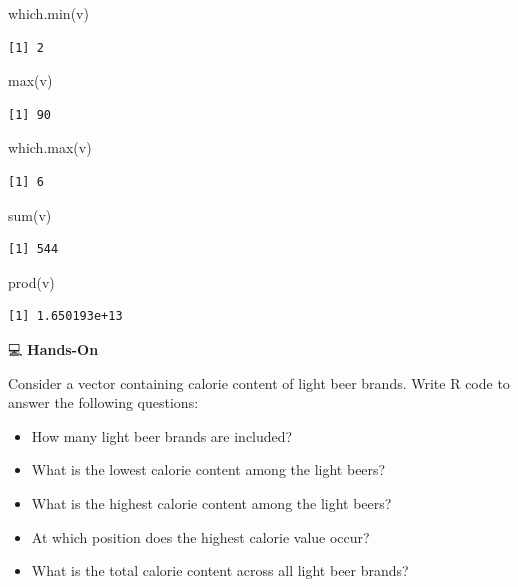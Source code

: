 \documentclass[
  letterpaper,
  DIV=11,
  numbers=noendperiod]{scrreprt}
\newenvironment{Shaded}{\begin{snugshade}}{\end{snugshade}}
\newcommand{\FunctionTok}[1]{\textcolor[rgb]{0.28,0.35,0.67}{#1}}
\newcommand{\NormalTok}[1]{\textcolor[rgb]{0.00,0.23,0.31}{#1}}
\begin{document}
\begin{Shaded}
\begin{Highlighting}[]
\FunctionTok{which.min}\NormalTok{(v)}
\end{Highlighting}
\end{Shaded}

\begin{verbatim}
[1] 2
\end{verbatim}

\begin{Shaded}
\begin{Highlighting}[]
\FunctionTok{max}\NormalTok{(v)}
\end{Highlighting}
\end{Shaded}

\begin{verbatim}
[1] 90
\end{verbatim}

\begin{Shaded}
\begin{Highlighting}[]
\FunctionTok{which.max}\NormalTok{(v)}
\end{Highlighting}
\end{Shaded}

\begin{verbatim}
[1] 6
\end{verbatim}

\begin{Shaded}
\begin{Highlighting}[]
\FunctionTok{sum}\NormalTok{(v)}
\end{Highlighting}
\end{Shaded}

\begin{verbatim}
[1] 544
\end{verbatim}

\begin{Shaded}
\begin{Highlighting}[]
\FunctionTok{prod}\NormalTok{(v)}
\end{Highlighting}
\end{Shaded}

\begin{verbatim}
[1] 1.650193e+13
\end{verbatim}

💻 \textbf{Hands-On}

Consider a vector containing calorie content of light beer brands. Write
R code to answer the following questions:

\begin{itemize}
\item
  How many light beer brands are included?
\item
  What is the lowest calorie content among the light beers?
\item
  What is the highest calorie content among the light beers?
\item
  At which position does the highest calorie value occur?
\item
  What is the total calorie content across all light beer brands?
\end{itemize}
\end{document}
